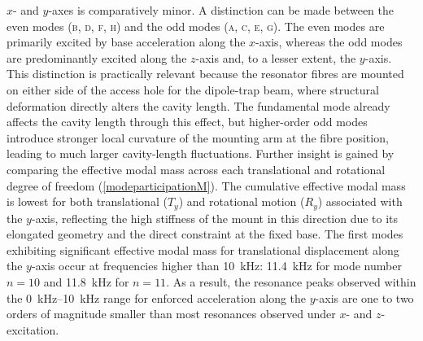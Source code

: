 \documentclass[../Thesis-IJspeert.tex]{subfiles}
\begin{document}
$x$- and $y$-axes is comparatively minor. A distinction can be made between the even modes \textsc{(b, d, f, h)} and the odd modes \textsc{(a, c, e, g)}. The even modes are primarily excited by base acceleration along the $x$-axis, whereas the odd modes are predominantly excited along the $z$-axis and, to a lesser extent, the $y$-axis. This distinction is practically relevant because the resonator fibres are mounted on either side of the access hole for the dipole-trap beam, where structural deformation directly alters the cavity length. The fundamental mode already affects the cavity length through this effect, but higher-order odd modes introduce stronger local curvature of the mounting arm at the fibre position, leading to much larger cavity-length fluctuations. Further insight is gained by comparing the effective modal mass across each translational and rotational degree of freedom (\autoref{modeparticipationM}). The cumulative effective modal mass is lowest for both translational ($T_y$) and rotational motion ($R_y$) associated with the $y$-axis, reflecting the high stiffness of the mount in this direction due to its elongated geometry and the direct constraint at the fixed base. The first modes exhibiting significant effective modal mass for translational displacement along the $y$-axis occur at frequencies higher than \SI{10}{\kilo\hertz}: \SI{11.4}{\kilo\hertz} for mode number $n=10$ and \SI{11.8}{\kilo\hertz}  for $n=11$. As a result, the resonance peaks observed within the \SIrange{0}{10}{\kilo\hertz} range for enforced acceleration along the $y$-axis are one to two orders of magnitude smaller than most resonances observed under $x$- and $z$-excitation.
\end{document}

